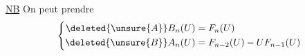 \uline{NB} On peut prendre
\[
\left\{\begin{aligned}
\deleted{\unsure{A}}B_n(U)&=F_n(U)\\
\deleted{\unsure{B}}A_n(U)&=F_{n-2}(U)-UF_{n-1}(U)
\end{aligned}\right.
\]
